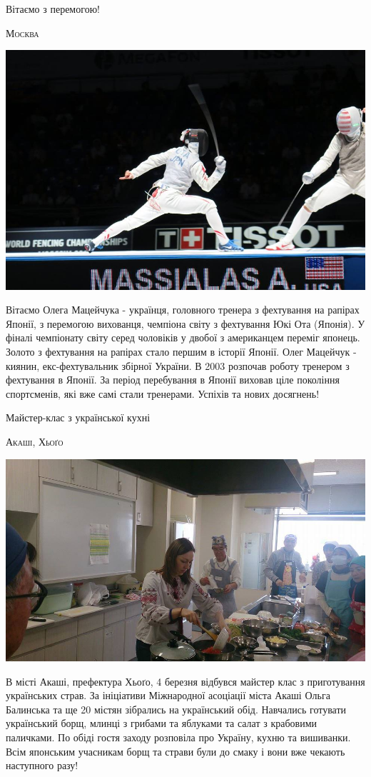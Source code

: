 \documentclass[10pt,a4paper]{article}
\newcommand{\NewsItem}[1]{%
		\usefont{T2A}{iwona}{m}{n} 
		\large #1 \vspace{4pt}
		\par \normalsize \normalfont}
\newcommand{\NewsAuthor}[1]{%
			\hfill \textsc{#1} \vspace{4pt}
			\par \normalfont}
\begin{document}
\begin{multicols}{3}
\vspace{1cm}
	\NewsItem{Вітаємо з перемогою!}
	\NewsAuthor{Москва}
		\begin{center}
			\includegraphics[width=0.8\linewidth]{images/rapiry}
		\end{center}
Вітаємо Олега Мацейчука - українця, головного тренера з фехтування на рапірах Японії, з перемогою вихованця, чемпіона світу з фехтування Юкі Ота (Японія). 
У фіналі чемпіонату світу серед чоловіків у двобої з американцем переміг японець. Золото з фехтування на рапірах стало першим в історії Японії.
Олег Мацейчук - киянин, екс-фехтувальник збірної України. В 2003 розпочав роботу тренером з фехтування в Японії. За період перебування в Японії виховав ціле покоління спортсменів, які вже самі стали тренерами.
Успіхів та нових досягнень!

\vspace{1cm}
\NewsItem{Майстер-клас з української кухні}
\NewsAuthor{Акаші, Хьоґо}
		\begin{center}
			\includegraphics[width=0.8\linewidth]{images/ukr-cuisine-akashi}
		\end{center}
В місті Акаші, префектура Хьоґо, 4 березня відбувся майстер клас з приготування українських страв. За ініціативи Міжнародної асоціації міста Акаші Ольга Балинська та ще 20 містян зібрались на український обід. Навчались готувати український борщ, млинці з грибами та яблуками та салат з крабовими паличками. По обіді гостя заходу розповіла про Україну, кухню та вишиванки. Всім японським учасникам борщ та страви були до смаку і вони вже чекають наступного разу!


\end{multicols}
\end{document}
